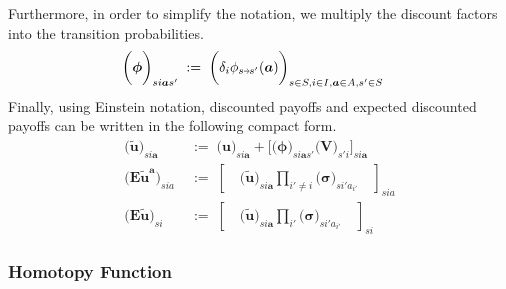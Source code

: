 \documentclass[11pt,fleqn]{article}
\newcommand{\bsigma}{\bm{\sigma}}
\newcommand{\bV}{\bm{V}}
\newcommand{\ba}{\bm{a}}
\newcommand{\tu}{\tilde{u}}
\newcommand{\shortrightarrow}{\parbox{4pt}{\tikz{\draw[->](0,0)--(4pt,0);}}}
\newcommand{\phiss}{\phi_{s\shortrightarrow s'}}
\begin{document}
Furthermore, in order to simplify the notation, we multiply the discount factors into the transition probabilities.
\begin{align*}
	\biggl( \bm{\phi} \biggr)_{si\ba s'} &\;:=\; \biggl( \delta_i \phiss(\ba) \biggr)_{s\in S, i\in I, \ba\in A, s'\in S}
\end{align*}
Finally, using Einstein notation, discounted payoffs and expected discounted payoffs can be written in the following compact form.
\begin{align*}
	\biggl( \bm{{\tu}} \biggr)_{si\ba} &\;:=\; \biggl( \bm{u} \biggr)_{si\ba} + \Biggl[ \biggl( \bm{\phi} \biggr)_{si\ba s'} \biggl( \bV \biggr)_{s'i} \Biggr]_{si\ba} \\
	\biggl( \bm{{E\tu^a}} \biggr)_{sia} &\;:=\; \left[ \quad \biggl( \bm{{\tu}} \biggr)_{si\ba} \prod\limits_{i'\neq i} \biggl( \bsigma \biggr)_{si'a_{i'}} \quad \right]_{sia} \\
	\biggl( \bm{{E\tu}} \biggr)_{si} &\;:=\; \left[ \quad \biggl( \bm{{\tu}} \biggr)_{si\ba} \prod\limits_{i'} \biggl( \bsigma \biggr)_{si'a_{i'}} \quad \right]_{si}
\end{align*}


\subsubsection*{Homotopy Function}
\end{document}
